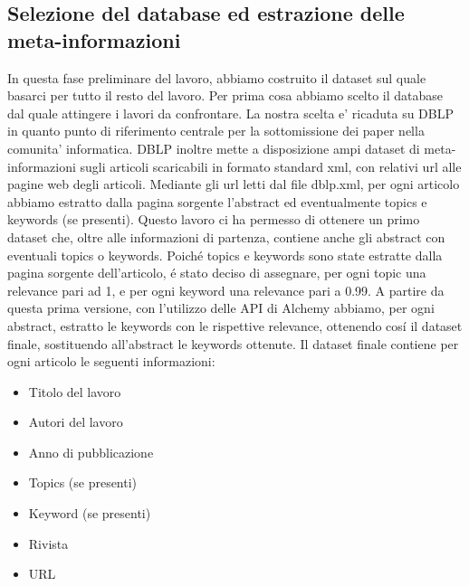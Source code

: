\documentclass[11pt,a4paper]{article}
\begin{document}
\subsection{Selezione del database ed estrazione delle meta-informazioni}
\label{subsec:infoextraction}
In questa fase preliminare del lavoro, abbiamo costruito il dataset sul quale basarci per tutto il resto del lavoro. Per prima cosa abbiamo scelto il database dal quale attingere i lavori da confrontare. La nostra scelta e' ricaduta su DBLP\cite{DBLP} in quanto punto di riferimento centrale per la sottomissione dei paper nella comunita' informatica. DBLP inoltre mette a disposizione ampi dataset di meta-informazioni sugli articoli scaricabili in formato standard xml, con relativi url alle pagine web degli articoli.
Mediante gli url letti dal file dblp.xml, per ogni articolo abbiamo estratto dalla pagina sorgente l'abstract ed eventualmente topics e keywords (se presenti). Questo lavoro ci ha permesso di ottenere un primo dataset che, oltre alle informazioni di partenza, contiene anche gli abstract con eventuali topics o keywords. Poich\'e topics e keywords sono state estratte dalla pagina sorgente dell'articolo, \'e stato deciso di assegnare, per ogni topic una relevance pari ad 1, e per ogni keyword una relevance pari a 0.99.\newline \newline
A partire da questa prima versione, con l'utilizzo delle API di Alchemy abbiamo, per ogni abstract, estratto le keywords con le rispettive relevance, ottenendo cos\'i il dataset finale, sostituendo all'abstract le keywords ottenute. Il dataset finale contiene per ogni articolo le seguenti informazioni:

\begin{itemize}
	\item Titolo del lavoro
	\item Autori del lavoro
	\item Anno di pubblicazione
	\item Topics (se presenti)
	\item Keyword (se presenti)
	\item Rivista
	\item URL
\end{itemize} 
\end{document}
